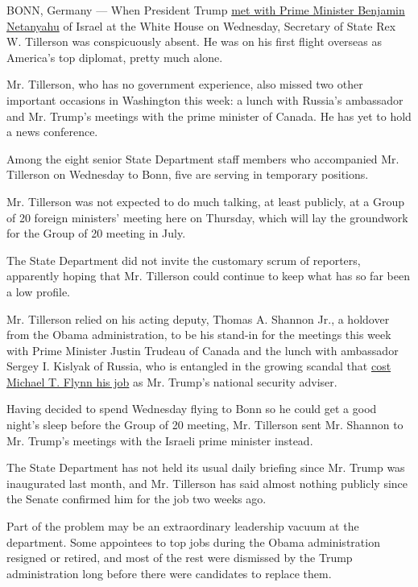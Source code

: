 BONN, Germany --- When President Trump
\href{https://www.nytimes.com/2017/02/15/world/middleeast/benjamin-netanyahu-israel-trump.html}{met
with Prime Minister Benjamin Netanyahu} of Israel at the White House on
Wednesday, Secretary of State Rex W. Tillerson was conspicuously absent.
He was on his first flight overseas as America's top diplomat, pretty
much alone.

Mr. Tillerson, who has no government experience, also missed two other
important occasions in Washington this week: a lunch with Russia's
ambassador and Mr. Trump's meetings with the prime minister of Canada.
He has yet to hold a news conference.

Among the eight senior State Department staff members who accompanied
Mr. Tillerson on Wednesday to Bonn, five are serving in temporary
positions.

Mr. Tillerson was not expected to do much talking, at least publicly, at
a Group of 20 foreign ministers' meeting here on Thursday, which will
lay the groundwork for the Group of 20 meeting in July.

The State Department did not invite the customary scrum of reporters,
apparently hoping that Mr. Tillerson could continue to keep what has so
far been a low profile.

Mr. Tillerson relied on his acting deputy, Thomas A. Shannon Jr., a
holdover from the Obama administration, to be his stand-in for the
meetings this week with Prime Minister Justin Trudeau of Canada and the
lunch with ambassador Sergey I. Kislyak of Russia, who is entangled in
the growing scandal that
\href{https://www.nytimes.com/2017/02/13/us/politics/donald-trump-national-security-adviser-michael-flynn.html}{cost
Michael T. Flynn his job} as Mr. Trump's national security adviser.

Having decided to spend Wednesday flying to Bonn so he could get a good
night's sleep before the Group of 20 meeting, Mr. Tillerson sent Mr.
Shannon to Mr. Trump's meetings with the Israeli prime minister instead.

The State Department has not held its usual daily briefing since Mr.
Trump was inaugurated last month, and Mr. Tillerson has said almost
nothing publicly since the Senate confirmed him for the job two weeks
ago.

Part of the problem may be an extraordinary leadership vacuum at the
department. Some appointees to top jobs during the Obama administration
resigned or retired, and most of the rest were dismissed by the Trump
administration long before there were candidates to replace them.

